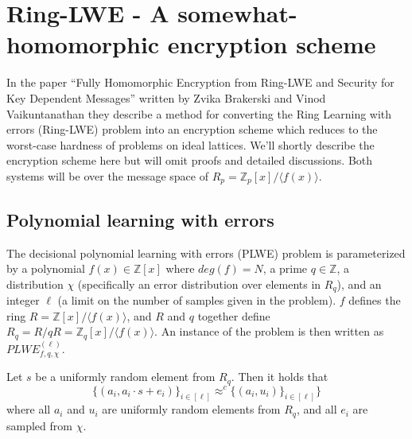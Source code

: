 \documentclass[../main.tex]{subfiles}
\begin{document}
\section{Ring-LWE - A somewhat-homomorphic encryption scheme} \label{sec:RLWE-theory}

In the paper ``Fully Homomorphic Encryption from Ring-LWE and Security for Key Dependent Messages'' written by
Zvika Brakerski and Vinod Vaikuntanathan \cite{brakerski2011fully}
they describe a method for converting the Ring Learning with errors (Ring-LWE) problem into an encryption scheme
which reduces to the worst-case hardness of problems on ideal lattices.
We'll shortly describe the encryption scheme here but will omit proofs and detailed discussions.
Both systems will be over the message space of $R_p = \mathbb{Z}_p[x] / \langle f(x) \rangle$.


\subsection{Polynomial learning with errors}

The decisional polynomial learning with errors (PLWE) problem is parameterized by a polynomial $f(x) \in \mathbb{Z}[x]$ where $deg(f) = N$, a prime $q \in \mathbb{Z}$, a distribution $\chi$ (specifically an error distribution over elements in $R_q$), and an integer $\ell$ (a limit on the number of samples given in the problem).
$f$ defines the ring $R = \mathbb{Z}[x] / \langle f(x) \rangle$, and $R$ and $q$ together define $R_q = R / q R = \mathbb{Z}_q[x] / \langle f(x) \rangle$.
An instance of the problem is then written as $PLWE_{f, q, \chi}^{(\ell)}$.

\begin{definition}
    Let $s$ be a uniformly random element from $R_q$.
    Then it holds that 
    \[
        \{ (a_i, a_i \cdot s + e_i) \}_{i \in [\ell]} \approx^{c} \{(a_i, u_i) \}_{i \in [\ell]}\}
    \]
    where all $a_i$ and $u_i$ are uniformly random elements from $R_q$, and all $e_i$ are sampled from $\chi$.
\end{definition}
\end{document}
